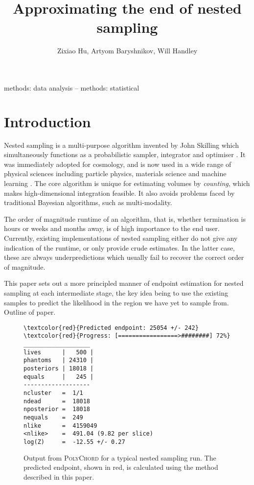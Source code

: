 \documentclass[usenatbib]{mnras}
\title[Approximating the end of nested sampling]{Approximating the end of nested sampling}
\author[Z. Hu et. al]{Zixiao Hu, Artyom Baryshnikov, Will Handley}
\begin{document}
\label{firstpage}
\pagerange{\pageref{firstpage}--\pageref{lastpage}}
\maketitle


\begin{abstract}
\end{abstract}

\begin{keywords}
methods: data analysis -- methods: statistical
\end{keywords}

\section{Introduction}
Nested sampling is a multi-purpose algorithm invented by John Skilling which simultaneously functions as a probabilistic sampler, integrator and optimiser \citep{skilling}. It was immediately adopted for cosmology, and is now used in a wide range of physical sciences including particle physics, materials science \citep{physical_scientists} and machine learning \citep{sparse_reconstruction}. The core algorithm is unique for estimating volumes by \textit{counting}, which makes high-dimensional integration feasible. It also avoids problems faced by traditional Bayesian algorithms, such as multi-modality.
\par
The order of magnitude runtime of an algorithm, that is, whether termination is hours or weeks and months away, is of high importance to the end user. Currently, existing implementations of nested sampling either do not give any indication of the runtime, or only provide crude estimates. In the latter case, these are always underpredictions which usually fail to recover the correct order of magnitude. 
\par
This paper sets out a more principled manner of endpoint estimation for nested sampling at each intermediate stage, the key idea being to use the existing samples to predict the likelihood in the region we have yet to sample from. Outline of paper.
\begin{figure}
\begin{Verbatim}[frame=single, commandchars=\\\{\}]
\textcolor{red}{Predicted endpoint: 25054 +/- 242}
\textcolor{red}{Progress: [=================>########] 72%}
___________________
lives      |   500 |
phantoms   | 24310 |
posteriors | 18018 |
equals     |   245 |
-------------------
ncluster   =  1/1
ndead      =  18018
nposterior =  18018
nequals    =  249
nlike      =  4159049
<nlike>    =  491.04 (9.82 per slice)
log(Z)     =  -12.55 +/- 0.27
\end{Verbatim}
\caption{Output from \textsc{PolyChord} for a typical nested sampling run. The predicted endpoint, shown in red, is calculated using the method described in this paper.}
\label{fig:polychord_output}
\end{figure}
\end{document}
